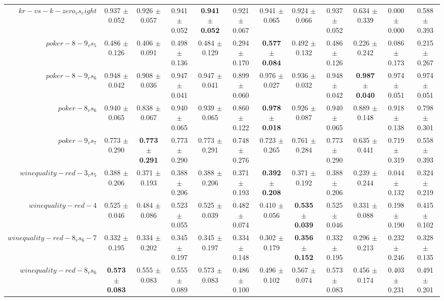 \begin{table}[!ht]
{\begin{tabular}{r c c c c c c c c c c c}
$kr-vs-k-zero_vs_eight$ & 0.937 $\pm$ 0.052 & 0.926 $\pm$ 0.057 & 0.941 $\pm$ 0.052 & \textbf{0.941 $\pm$ 0.052} & 0.921 $\pm$ 0.067 & 0.941 $\pm$ 0.065 & 0.924 $\pm$ 0.066 & 0.937 $\pm$ 0.052 & 0.634 $\pm$ 0.339 & 0.000 $\pm$ 0.000 & 0.588 $\pm$ 0.393 \\
$poker-8-9_vs_5$ & 0.486 $\pm$ 0.126 & 0.406 $\pm$ 0.091 & 0.498 $\pm$ 0.136 & 0.484 $\pm$ 0.129 & 0.294 $\pm$ 0.170 & \textbf{0.577 $\pm$ 0.084} & 0.492 $\pm$ 0.132 & 0.486 $\pm$ 0.126 & 0.226 $\pm$ 0.242 & 0.086 $\pm$ 0.173 & 0.215 $\pm$ 0.267 \\
$poker-8-9_vs_6$ & 0.948 $\pm$ 0.042 & 0.908 $\pm$ 0.036 & 0.947 $\pm$ 0.041 & 0.947 $\pm$ 0.041 & 0.899 $\pm$ 0.060 & 0.976 $\pm$ 0.027 & 0.936 $\pm$ 0.032 & 0.948 $\pm$ 0.042 & \textbf{0.987 $\pm$ 0.040} & 0.974 $\pm$ 0.051 & 0.974 $\pm$ 0.051 \\
$poker-8_vs_6$ & 0.940 $\pm$ 0.065 & 0.838 $\pm$ 0.067 & 0.940 $\pm$ 0.065 & 0.939 $\pm$ 0.065 & 0.860 $\pm$ 0.122 & \textbf{0.978 $\pm$ 0.018} & 0.926 $\pm$ 0.087 & 0.940 $\pm$ 0.065 & 0.889 $\pm$ 0.148 & 0.918 $\pm$ 0.138 & 0.798 $\pm$ 0.301 \\
$poker-9_vs_7$ & 0.773 $\pm$ 0.290 & \textbf{0.773 $\pm$ 0.291} & 0.773 $\pm$ 0.290 & 0.773 $\pm$ 0.291 & 0.748 $\pm$ 0.276 & 0.723 $\pm$ 0.265 & 0.761 $\pm$ 0.284 & 0.773 $\pm$ 0.290 & 0.635 $\pm$ 0.441 & 0.719 $\pm$ 0.319 & 0.558 $\pm$ 0.393 \\
$winequality-red-3_vs_5$ & 0.388 $\pm$ 0.206 & 0.371 $\pm$ 0.193 & 0.388 $\pm$ 0.206 & 0.388 $\pm$ 0.206 & 0.371 $\pm$ 0.193 & \textbf{0.392 $\pm$ 0.208} & 0.371 $\pm$ 0.192 & 0.388 $\pm$ 0.206 & 0.239 $\pm$ 0.244 & 0.044 $\pm$ 0.132 & 0.324 $\pm$ 0.219 \\
$winequality-red-4$ & 0.525 $\pm$ 0.046 & 0.484 $\pm$ 0.086 & 0.523 $\pm$ 0.055 & 0.525 $\pm$ 0.039 & 0.482 $\pm$ 0.074 & 0.410 $\pm$ 0.056 & \textbf{0.535 $\pm$ 0.039} & 0.525 $\pm$ 0.046 & 0.331 $\pm$ 0.088 & 0.198 $\pm$ 0.190 & 0.415 $\pm$ 0.102 \\
$winequality-red-8_vs_6-7$ & 0.332 $\pm$ 0.195 & 0.334 $\pm$ 0.202 & 0.345 $\pm$ 0.197 & 0.345 $\pm$ 0.197 & 0.334 $\pm$ 0.148 & 0.302 $\pm$ 0.179 & \textbf{0.356 $\pm$ 0.152} & 0.332 $\pm$ 0.195 & 0.296 $\pm$ 0.213 & 0.232 $\pm$ 0.246 & 0.328 $\pm$ 0.135 \\
$winequality-red-8_vs_6$ & \textbf{0.573 $\pm$ 0.083} & 0.555 $\pm$ 0.083 & 0.555 $\pm$ 0.089 & 0.573 $\pm$ 0.083 & 0.486 $\pm$ 0.100 & 0.496 $\pm$ 0.102 & 0.567 $\pm$ 0.074 & 0.573 $\pm$ 0.083 & 0.456 $\pm$ 0.174 & 0.403 $\pm$ 0.231 & 0.491 $\pm$ 0.201 \\

\end{tabular}}
\end{table}
